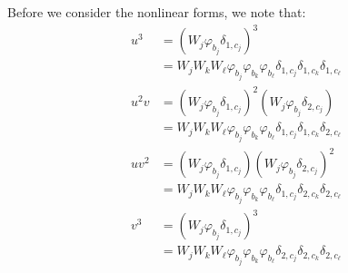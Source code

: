\documentclass{article}
\begin{document}
Before we consider the nonlinear forms, we note that:
\begin{align*}
    u^3 & = (W_j \varphi_{b_j} \delta_{1, c_j})^3 \\
        & = W_j W_k W_\ell \varphi_{b_j} \varphi_{b_k} \varphi_{b_\ell}
            \delta_{1, c_j} \delta_{1, c_k} \delta_{1, c_\ell} \\
    u^2 v & = (W_j \varphi_{b_j} \delta_{1, c_j})^2 (W_j \varphi_{b_j} \delta_{2, c_j}) \\
        & = W_j W_k W_\ell \varphi_{b_j} \varphi_{b_k} \varphi_{b_\ell}
            \delta_{1, c_j} \delta_{1, c_k} \delta_{2, c_\ell} \\
    u v^2 & = (W_j \varphi_{b_j} \delta_{1, c_j}) (W_j \varphi_{b_j} \delta_{2, c_j})^2 \\
        & = W_j W_k W_\ell \varphi_{b_j} \varphi_{b_k} \varphi_{b_\ell}
            \delta_{1, c_j} \delta_{2, c_k} \delta_{2, c_\ell} \\
    v^3 & = (W_j \varphi_{b_j} \delta_{1, c_j})^3 \\
        & = W_j W_k W_\ell \varphi_{b_j} \varphi_{b_k} \varphi_{b_\ell}
            \delta_{2, c_j} \delta_{2, c_k} \delta_{2, c_\ell}
\end{align*}
\end{document}
